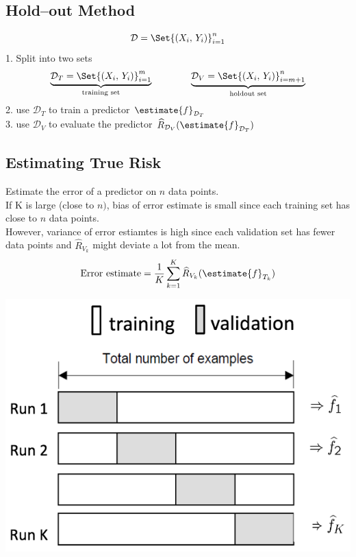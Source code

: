 \documentclass[18pt,a3paper,landscape, ncols=3]{cheatsheet}
\begin{document}
		\subsection{Hold--out Method}
			\begin{mdframed}
				\[
					\mathcal{D} = \Set{(X_i,\, Y_i)}_{i=1}^{n}
				\]
				1. Split into two sets
				\[
					\underbrace{\mathcal{D}_{T} = \Set{(X_i,\, Y_i)}_{i=1}^{m}}_{\text{training set}}
					\qquad\qquad
					\underbrace{\mathcal{D}_{V} = \Set{(X_i,\, Y_i)}_{i=m+1}^{n}}_{\text{holdout set}}
				\]
				2. use \(\mathcal{D}_{T}\) to train a predictor \(\estimate{f}_{\mathcal{D}_{T}}\)\\
				3. use \(\mathcal{D}_{V}\) to evaluate the predictor \(\widehat{R}_{\mathcal{D}_{V}}(\estimate{f}_{\mathcal{D}_{T}})\)
			\end{mdframed}
		\subsection{Estimating True Risk}
			\begin{mdframed}
				\begin{minipage}{.5\textwidth}
					Estimate the error of a predictor on \(n\) data points.\\
					If K is large (close to \(n)\), bias of error estimate is small since each training set has close to \(n\) data points.\\
					However, variance of error estiamtes is high since each validation set has fewer data points and \(\widehat{R}_{V_{k}}\) might deviate a lot from the mean.\\
					\[
						\text{Error estimate} = \frac{1}{K} \sum_{k=1}^{K} \widehat{R}_{V_{k}} (\estimate{f}_{T_{k}})
					\]
				\end{minipage}%
				\begin{minipage}{.5\textwidth}
					\includegraphics{estimating_true_risk.png}
				\end{minipage}
			\end{mdframed}
\end{document}
